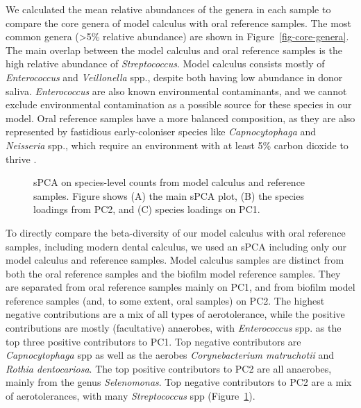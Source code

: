 \documentclass[10pt,a4paper]{article}
\begin{document}
We calculated the mean relative abundances of the genera in each sample
to compare the core genera of model calculus with oral reference
samples. The most common genera (\textgreater5\% relative abundance) are
shown in Figure~\ref{fig-core-genera}. The main overlap between the
model calculus and oral reference samples is the high relative abundance
of \emph{Streptococcus}. Model calculus consists mostly of
\emph{Enterococcus} and \emph{Veillonella} spp., despite both having low
abundance in donor saliva. \emph{Enterococcus} are also known
environmental contaminants, and we cannot exclude environmental
contamination as a possible source for these species in our model. Oral
reference samples have a more balanced composition, as they are also
represented by fastidious early-coloniser species like
\emph{Capnocytophaga} and \emph{Neisseria} spp., which require an
environment with at least 5\% carbon dioxide to thrive
\citep{tonjumNeisseria2017}.

\begin{figure}


\caption{\label{fig-spca-compar}sPCA on species-level counts from model
calculus and reference samples. Figure shows (A) the main sPCA plot, (B)
the species loadings from PC2, and (C) species loadings on PC1.}

\end{figure}%

To directly compare the beta-diversity of our model calculus with oral
reference samples, including modern dental calculus, we used an sPCA
including only our model calculus and reference samples. Model calculus
samples are distinct from both the oral reference samples and the
biofilm model reference samples. They are separated from oral reference
samples mainly on PC1, and from biofilm model reference samples (and, to
some extent, oral samples) on PC2. The highest negative contributions
are a mix of all types of aerotolerance, while the positive
contributions are mostly (facultative) anaerobes, with
\emph{Enterococcus} spp. as the top three positive contributors to PC1.
Top negative contributors are \emph{Capnocytophaga} spp as well as the
aerobes \emph{Corynebacterium matruchotii} and \emph{Rothia
dentocariosa}. The top positive contributors to PC2 are all anaerobes,
mainly from the genus \emph{Selenomonas}. Top negative contributors to
PC2 are a mix of aerotolerances, with many \emph{Streptococcus} spp
(Figure~\ref{fig-spca-compar}).
\end{document}

